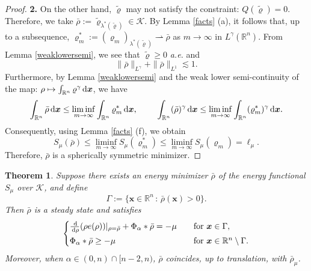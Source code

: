 \documentclass[reqno,11pt]{amsart}
\numberwithin{equation}{section}
\newcommand{\R}{\mathbb{R}}
\newtheorem{theorem}{Theorem}[section]
\theoremstyle{definition}
\def\dd{{\, \rm d}}
\begin{document}
\begin{proof}
    
 \medskip   
 \noindent
 {\bf 2.}
 On the other hand, $\tilde{\varrho}$ may not satisfy the constraint: $Q(\tilde{\varrho}) = 0$. 
 Therefore, we take $\bar{\rho} := \tilde{\varrho}_{\lambda^*(\tilde{\varrho})} \in \mathcal{K}$. 
 By Lemma \ref{facts} (a), it follows that,  up to a subsequence, 
 $\varrho_m^* := (\varrho_m)_{\lambda^*(\tilde{\varrho})} \rightharpoonup \bar{\rho}$ 
 as $m \to \infty$ in $L^\gamma(\mathbb{R}^n)$. 
 From Lemma \ref{weaklowersemi}, we see that $\tilde{\varrho} \geq 0$ {\it a.e.} and
    \[
    \| \bar{\rho} \|_{L^\gamma} + \| \bar{\rho} \|_{L^1} \lesssim 1.
    \]
    Furthermore, by Lemma \ref{weaklowersemi} and the weak lower semi-continuity 
   of the map: $\rho\mapsto \int_{\mathbb{R}^n} \varrho^\gamma \dd \boldsymbol{x}$, we have
    \[
    \int_{\mathbb{R}^n} \bar{\rho} \dd \boldsymbol{x} \leq \liminf_{m \to \infty} \int_{\mathbb{R}^n} \varrho_m^* \dd \boldsymbol{x}, \qquad \,\,
    \int_{\mathbb{R}^n} (\bar{\rho})^\gamma \dd \boldsymbol{x} \leq \liminf_{m \to \infty} \int_{\mathbb{R}^n} (\varrho_m^*)^\gamma \dd \boldsymbol{x}.
    \]
Consequently, using Lemma \ref{facts} (f), we obtain 
    $$
    S_\mu(\bar{\rho}) \leq \liminf_{m \to \infty} S_\mu(\varrho_m^*) \leq \liminf_{m \to \infty} S_\mu(\varrho_m) = \ell_\mu.
    $$
Therefore, $\bar{\rho}$ is a spherically symmetric minimizer.
    \end{proof}
    \setcounter{step}{0}

\begin{theorem}
Suppose there exists an energy minimizer $\bar{\rho}$ of the energy functional $S_\mu$ 
over $\mathcal{K}$, and define
\[
 \Gamma := \big\{ \boldsymbol{x} \in \mathbb{R}^n \, : \, \bar{\rho}(\boldsymbol{x}) > 0\big\}.
\]
Then $\bar{\rho}$ is a steady state and satisfies
\begin{align*}
\begin{cases}
\frac{\dd}{\dd \rho}(\rho e(\rho))|_{\rho=\bar{\rho}}+\Phi_\alpha\ast\bar{\rho}= - \mu
 \quad  &\mbox{for $\boldsymbol{x}\in \Gamma$},\\[1mm]
\Phi_\alpha\ast\bar{\rho}\geq - \mu &\mbox{for $\boldsymbol{x}\in \R^n\setminus\Gamma$}.
\end{cases}
\end{align*}
Moreover, when $\alpha \in (0,n) \cap [n-2,n)$, $\bar{\rho}$ coincides, up to translation, 
with $\bar{\rho}_\mu$.
\end{theorem}
\end{document}
